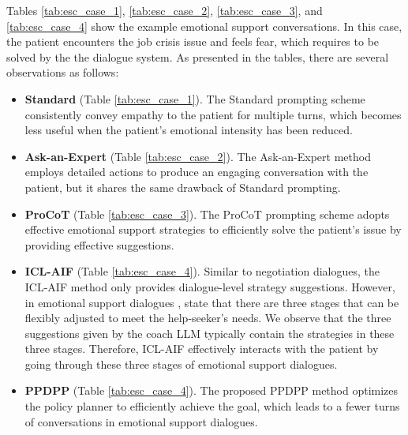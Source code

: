 \documentclass{article} %
\begin{document}




Tables \ref{tab:esc_case_1}, \ref{tab:esc_case_2},  \ref{tab:esc_case_3}, and \ref{tab:esc_case_4} show the example emotional support conversations. 
In this case, the patient encounters the job crisis issue and feels fear, which requires to be solved by the the dialogue system. 
As presented in the tables, there are several observations as follows:
\begin{itemize}[leftmargin=*]
    \item \textbf{Standard} (Table \ref{tab:esc_case_1}). The Standard prompting scheme consistently convey empathy to the patient for multiple turns, which becomes less useful when the patient's emotional intensity has been reduced. 
    \item \textbf{Ask-an-Expert} (Table \ref{tab:esc_case_2}). The Ask-an-Expert method employs detailed actions to produce an engaging conversation with the patient, but it shares the same drawback of Standard prompting. 
    \item \textbf{ProCoT} (Table \ref{tab:esc_case_3}). The ProCoT prompting scheme adopts effective emotional support strategies to efficiently solve the patient's issue by providing effective suggestions. 
    \item \textbf{ICL-AIF} (Table \ref{tab:esc_case_4}). Similar to negotiation dialogues, the ICL-AIF method only provides dialogue-level strategy suggestions. 
    However, in emotional support dialogues \citep{esconv}, \citet{helping-skill} state that there are three stages that can be flexibly adjusted to meet the help-seeker’s needs. 
    We observe that the three suggestions given by the coach LLM typically contain the strategies in these three stages. 
    Therefore, ICL-AIF effectively interacts with the patient by going through these three stages of emotional support dialogues. 
    \item \textbf{PPDPP} (Table \ref{tab:esc_case_4}). The proposed PPDPP method optimizes the policy planner to efficiently achieve the goal, which leads to a fewer turns of conversations in emotional support dialogues. 
\end{itemize}


\end{document}
